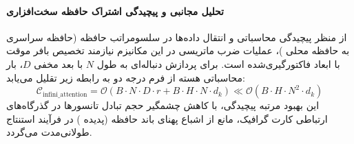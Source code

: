 \paragraph{تحلیل مجانبی و پیچیدگی اشتراک حافظه سخت‌افزاری}
از منظر پیچیدگی محاسباتی و انتقال داده‌ها در سلسومراتب حافظه (حافظه سراسری  به حافظه محلی )، عملیات ضرب ماتریسی در این مکانیزم نیازمند تخصیص بافر موقت با ابعاد فاکتورگیری‌شده است. برای پردازش دنباله‌ای به طول $N$ با بعد مخفی $D$، بار محاسباتی هسته از فرم درجه دو به رابطه زیر تقلیل می‌یابد:
\begin{equation}
\label{eq:complexity_infini_attention}
\mathcal{C}_{\text{infini\_attention}} = \mathcal{O}\left( B \cdot N \cdot D \cdot r + B \cdot H \cdot N \cdot d_k \right) \ll \mathcal{O}\left( B \cdot H \cdot N^2 \cdot d_k \right)
\end{equation}
این بهبود مرتبه پیچیدگی، با کاهش چشمگیر حجم تبادل تانسورها در گذرگاه‌های ارتباطی کارت گرافیک، مانع از اشباع پهنای باند حافظه (پدیده ) در فرآیند استنتاج طولانی‌مدت می‌گردد.